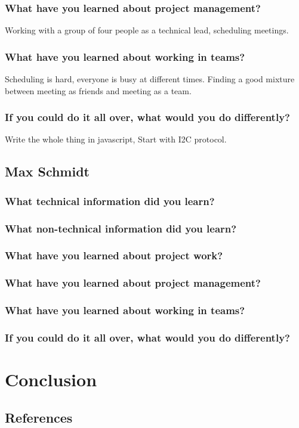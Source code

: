 \documentclass[onecolumn, draftclsnofoot,10pt, compsoc]{IEEEtran}
\begin{document}
 			\subsubsection{What have you learned about project management?}
			Working with a group of four people as a technical lead, scheduling meetings.
 			\subsubsection{What have you learned about working in teams?}
			Scheduling is hard, everyone is busy at different times. Finding a good mixture between meeting as friends and meeting as a team.
 			\subsubsection{If you could do it all over, what would you do differently?}
			Write the whole thing in javascript, Start with I2C protocol.
		\subsection{Max Schmidt}
			\subsubsection{What technical information did you learn?}
			\subsubsection{What non-technical information did you learn?}
			\subsubsection{What have you learned about project work?}
			\subsubsection{What have you learned about project management?}
			\subsubsection{What have you learned about working in teams?}
			\subsubsection{If you could do it all over, what would you do differently?}
	\section{Conclusion}


	\subsection{References}

	\begingroup
		\renewcommand{\addcontentsline}[3]{}%
		\renewcommand{\section}[2]{}%

		
		
\end{document}
